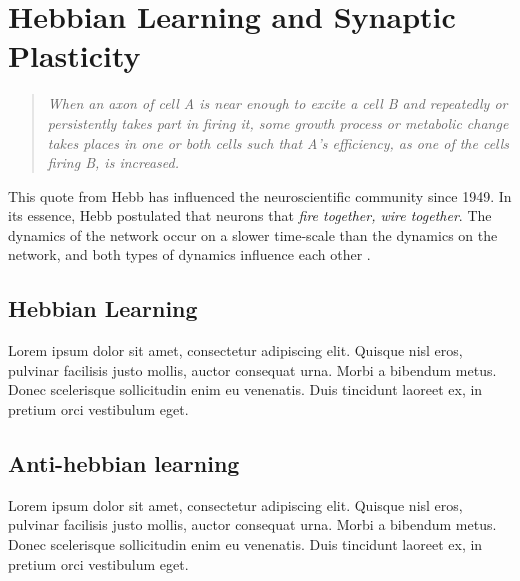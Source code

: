\newpage
\section{Hebbian Learning and Synaptic Plasticity}
\vspace{1mm}
\begin{quote}
\textsl{When an axon of cell A is near enough to excite a cell B and repeatedly or persistently takes part in firing it, some growth process or metabolic change takes places in one or both cells such that A's efficiency, as one of the cells firing B, is increased.}\cite{Hebb1949}
\end{quote}

This quote from Hebb has influenced the neuroscientific community since 1949. In its essence, Hebb postulated that neurons that \textsl{fire together, wire together}.  
The dynamics of the network occur on a slower time-scale than the dynamics on the network, and both types of dynamics influence each other \cite{AdaptiveNetworks2009}. 

\subsection{Hebbian Learning}
Lorem ipsum dolor sit amet, consectetur adipiscing elit. Quisque nisl eros, 
pulvinar facilisis justo mollis, auctor consequat urna. Morbi a bibendum metus. 
Donec scelerisque sollicitudin enim eu venenatis. Duis tincidunt laoreet ex, 
in pretium orci vestibulum eget.


\subsection{Anti-hebbian learning}
Lorem ipsum dolor sit amet, consectetur adipiscing elit. Quisque nisl eros, 
pulvinar facilisis justo mollis, auctor consequat urna. Morbi a bibendum metus. 
Donec scelerisque sollicitudin enim eu venenatis. Duis tincidunt laoreet ex, 
in pretium orci vestibulum eget.


